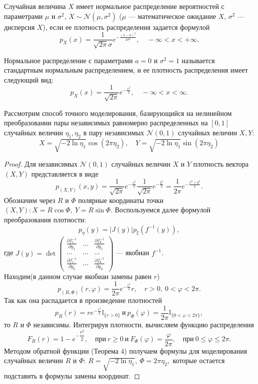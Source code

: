 \begin{definition}
	Случайная величина $ X $ имеет нормальное распределение вероятностей с параметрами
	 $ \mu $ и $ \sigma^2 $, $ X \sim \mathcal{N}(\mu,\sigma^2) $ ($ \mu $ ---
	 математическое ожидание $ X $, $ \sigma^2 $ --- дисперсия $ X $), если ее плотность
	 распределения задается формулой
	$$
	p_{X}(x) = \frac{1}{\sqrt{2\pi}\sigma} e^{-\frac{(x - a)^2} {2 \sigma^2}},
	 \quad -\infty < x < +\infty.
	$$
\end{definition}
\begin{definition}
	Нормальное распределение с параметрами $ a = 0 $ и $ \sigma^2 = 1 $ называется
	 стандартным нормальным распределением, и ее плотность распределения имеет
	 следующий вид:
	$$
	p_{X}(x) = \frac{1}{\sqrt{2\pi}} e^{-\frac{x^2}{2}}, \quad
	 -\infty < x < \infty.
	$$
\end{definition}
Рассмотрим способ точного моделирования, базирующийся на нелинейном преобразовании
 пары независимых равномерно распределенных на $ [0,1] $ случайных величин
 $ \eta_1, \eta_2 $ в пару независимых $ \mathcal{N}(0,1) $ случайных величин
 $ X, Y $:
 $$
 X = \sqrt{-2 \ln\eta_1} \cos(2 \pi \eta_2), \quad Y = \sqrt{-2 \ln \eta_1}
 \sin(2 \pi \eta_2)
 $$
\begin{proof}
	Для независимых $ \mathcal{N}(0,1) $ случайных величин $ X $ и $ Y $
	 плотность вектора $ (X,Y) $ представляется в виде
	$$
	p_{(X,Y)}(x,y) = \frac{1}{\sqrt{2 \pi}} e^{-\frac{x^2}{2}}
	 \frac{1}{\sqrt{2 \pi}} e^{-\frac{y^2}{2}} = \frac{1}{2 \pi}
	 e^{-\frac{x^2 + y^2}{2}}.
	$$
	Обозначим через $ R $ и $ \varPhi $ полярные координаты точки $ (X, Y): X =
	 R \cos \varPhi, \ Y = R \sin \varPhi $. Воспользуемся далее формулой
	 преобразования плотности:
	$$
	p_{\eta}(y) = |J(y)| p_{\xi}(f^{-1}(y)),
	$$
	где 
	$
	J(y) = \det
 	\begin{pmatrix}
  		\frac{\partial f_1^{-1}}{\partial y_1} & \dots & \frac{\partial f_k^{-1}}
		 {\partial y_1} \\
  		\dots  & \dots  & \dots \\
  		\frac{\partial f_1^{-1}}{\partial y_k} & \dots & \frac{\partial f_k^{-1}}
		 {\partial{y_k}}
	\end{pmatrix}
	$ --- якобиан $ f^{-1} $. \medskip\\ 
	Находим(в данном случае якобиан замены равен $ r $) 
	$$
	p_{(R, \varPhi)}(r, \varphi) = \frac{1}{2 \pi} e^{-\frac{r^2}{2}} r, \quad r > 0,
	 \ 0 < \varphi < 2 \pi.
	$$
	Так как она распадается в произведение плотностей 
	$$ 
	p_R(r) = r e^{-\frac{r^2}{2}} \mathbb{I}_{\{r > 0 \}} \ \text{и} \
	 p_{\varPhi}(\varphi) = \dfrac{1}{2 \pi} \mathbb{I}_{\{0 < \varphi < 2 \pi\}},
	$$ 
	то $ R $ и $ \varPhi $ независимы. Интегрируя плотности,
	 вычисляем функцию распределения 
	$$ 
	F_R(r) = 1 - e^{-\dfrac{r^2}{2}}, \quad \text{при} \ r \ge 0 \ \text{и} \
	 F_{\varPhi}(\varphi) = \dfrac{\varphi}{2 \pi}, \quad \text{при} \ 0 \le \varphi
	 \le 2 \pi.
	$$
	Методом обратной функции (Теорема 4) получаем формулы для моделирования случайных
	 величин $ R $ и $ \varPhi : \ R = \sqrt{-2 \ln \eta_1}, \ \varPhi = 2 \pi \eta_2, $
	 которые остается подставить в формулы замены координат.
\end{proof}
